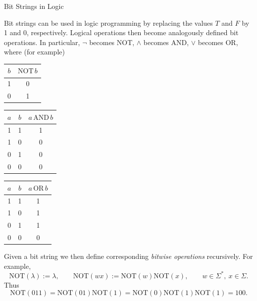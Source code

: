 \documentclass[smaller,hyperref={CJKbookmarks=true}]{beamer}
\begin{document}
\begin{frame}[t]{Bit Strings in Logic}
\begin{spacing}{1}
\vspace*{-5pt}
Bit strings can be used in logic programming by replacing the values $T$
and $F$ by 1 and 0, respectively. Logical operations then become
analogously defined bit operations. In particular, $\neg$ becomes NOT, $\wedge$ becomes AND, $\vee$ becomes OR, where (for example)
\begin{center}
  \begin{tabular}{c|c}
    $b$ & $\text{NOT}\,b$ \\ \hline
    1 & 0 \\
    0 & 1 \\
  \end{tabular}
  \qquad
  \begin{tabular}{c|c|c}
    $a$ & $b$ & $a\,\text{AND}\,b$ \\ \hline
    1 & 1 & 1 \\
    1 & 0 & 0 \\
    0 & 1 & 0 \\
    0 & 0 & 0 \\
  \end{tabular}
  \qquad
  \begin{tabular}{c|c|c}
    $a$ & $b$ & $a\,\text{OR}\,b$ \\ \hline
    1 & 1 & 1 \\
    1 & 0 & 1 \\
    0 & 1 & 1 \\
    0 & 0 & 0 \\
  \end{tabular}
\end{center}
Given a bit string we then define corresponding \emph{bitwise operations}
recursively. For example,
\[\text{NOT}(\lambda):=\lambda,\qquad
\text{NOT}(wx):=\text{NOT}(w)\text{NOT}(x),\qquad
w\in\Sigma^*,~x\in\Sigma.\]
Thus
\[\text{NOT}(011)=\text{NOT}(01)\text{NOT}(1)=\text{NOT}(0)
\text{NOT}(1)\text{NOT}(1)=100.\]
\end{spacing}
\end{frame}
\end{document}
